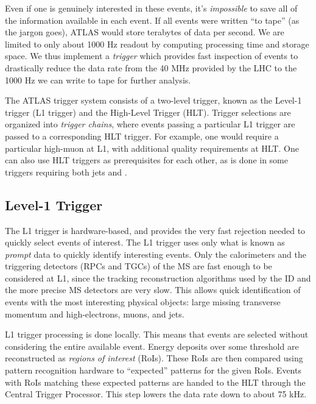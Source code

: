 Even if one is genuinely interested in these events, it's \textit{impossible} to save all of the information available in each event.
If all events were written ``to tape'' (as the jargon goes), ATLAS would store terabytes of data per second.
We are limited to only about 1000 Hz readout by computing processing time and storage space.
We thus implement a \textit{trigger} which provides fast inspection of events to drastically reduce the data rate from the 40 MHz provided by the LHC to the 1000 Hz we can write to tape for further analysis.

The ATLAS trigger system consists of a two-level trigger, known as the Level-1 trigger (L1 trigger) and the High-Level Trigger (HLT)\footnotemark.
Trigger selections are organized into \textit{trigger chains}, where events passing a particular L1 trigger are passed to a corresponding HLT trigger.
For example, one would require a particular high-\pt muon at L1, with additional quality requirements at HLT.
One can also use HLT triggers as prerequisites for each other, as is done in some triggers requiring both jets and \met.

\subsection{Level-1 Trigger}

The L1 trigger is hardware-based, and provides the very fast rejection needed to quickly select events of interest.
The L1 trigger uses only what is known as \textit{prompt} data to quickly identify interesting events.
Only the calorimeters and the triggering detectors (RPCs and TGCs)  of the MS are fast enough to be considered at L1, since the tracking reconstruction algorithms used by the ID and the more precise MS detectors are very slow.
This allows quick identification of events with the most interesting physical objects: large missing transverse momentum and high-\pt electrons, muons, and jets.

L1 trigger processing is done locally.
This means that events are selected without considering the entire available event.
Energy deposits over some threshold are reconstructed as \textit{regions of interest} (RoIs).
These RoIs are then compared using pattern recognition hardware to ``expected'' patterns for the given RoIs.
Events with RoIs matching these expected patterns are handed to the HLT through the Central Trigger Processor.
This step lowers the data rate down to about 75 kHz.

